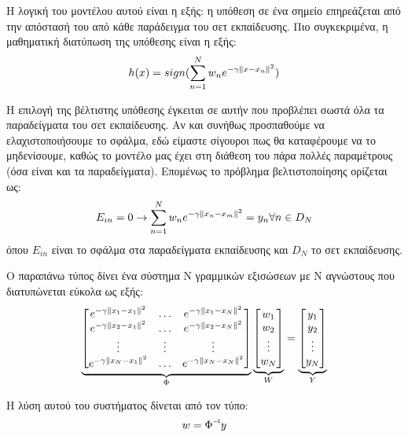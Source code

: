 Η λογική του  μοντέλου αυτού είναι η εξής: η υπόθεση σε ένα σημείο επηρεάζεται από την απόστασή του από κάθε παράδειγμα του σετ εκπαίδευσης. Πιο συγκεκριμένα, η μαθηματική διατύπωση της υπόθεσης είναι η εξής:
\begin{equation}
h(x)= sign( \sum_{n=1}^{N} w_n e^{-\gamma \left\lVert x - x_n\right\rVert^2})
\end{equation}

Η επιλογή της βέλτιστης υπόθεσης έγκειται σε αυτήν που προβλέπει σωστά όλα τα παραδείγματα του σετ εκπαίδευσης. Αν και συνήθως προσπαθούμε να ελαχιστοποιήσουμε το σφάλμα, εδώ είμαστε σίγουροι πως θα καταφέρουμε να το μηδενίσουμε, καθώς το μοντέλο μας έχει στη διάθεση του πάρα πολλές παραμέτρους (όσα είναι και τα παραδείγματα). Επομένως το πρόβλημα βελτιστοποίησης ορίζεται ως:
\begin{equation}
E_{in}=0 \rightarrow  \sum_{n=1}^{N} w_n e^{-\gamma \left\lVert x_n - x_m\right\rVert^2}= y_n  \forall n \in D_N 
\end{equation}
όπου $E_{in}$ είναι το σφάλμα στα παραδείγματα εκπαίδευσης και $D_N$ το σετ εκπαίδευσης. 

Ο παραπάνω τύπος δίνει ένα σύστημα Ν γραμμικών εξισώσεων με Ν αγνώστους που διατυπώνεται εύκολα ως εξής:
\[
\underbrace{
	\begin{bmatrix}
	e^{-\gamma \left\lVert x_1 - x_1\right\rVert^2}  & \dots  &  e^{-\gamma \left\lVert x_1 - x_N\right\rVert^2} \\
	e^{-\gamma \left\lVert x_2 - x_1\right\rVert^2}  & \dots  &  e^{-\gamma \left\lVert x_2 - x_N\right\rVert^2} \\
	\vdots  & \vdots & \vdots \\
	e^{-\gamma \left\lVert x_N - x_1\right\rVert^2}  & \dots  &  e^{-\gamma \left\lVert x_N - x_N\right\rVert^2} \\
	\end{bmatrix}}_{  \Phi}
\underbrace{
	\begin{bmatrix}
	w_{1}       \\
	w_{2}        \\
	\vdots        \\
	w_{N}
	\end{bmatrix}}_{W}
=
\underbrace{
	\begin{bmatrix}
	y_{1}       \\
	y_{2}        \\
	\vdots        \\
	y_{N}
	\end{bmatrix}}_{Y}
\]

Η λύση αυτού του συστήματος δίνεται από τον τύπο:
\begin{equation}
w=\inv{\Phi} y
\end{equation}

